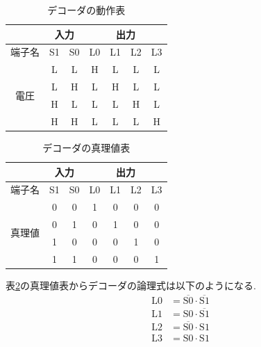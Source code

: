 \documentclass[a4paper, 11pt, uplatex]{jsarticle}
\begin{document}
\begin{table}[H]
  \begin{center}
  \caption{デコーダの動作表}
  \label{デコーダ動作表}
\begin{tabular}{|c|c|c|c|c|c|c|}
\hline
                    & \multicolumn{2}{c|}{入力} & \multicolumn{4}{c|}{出力} \\ \hline
端子名                &S1 & S0 &L0 &L1 &L2 &L3  \\ \hline \hline
\multirow{4}{*}{電圧} & L & L &H &L &L &L \\
                     & L & H &L &H &L &L \\
                     & H & L &L &L &H &L \\
                     & H & H &L &L &L &H \\ \hline
\end{tabular}
\end{center}
\end{table}

\begin{table}[H]
  \begin{center}
  \caption{デコーダの真理値表}
  \label{デコーダ真理値表}
\begin{tabular}{|c|c|c|c|c|c|c|}
\hline
                    & \multicolumn{2}{c|}{入力} & \multicolumn{4}{c|}{出力} \\ \hline
端子名                &S1 & S0 &L0 &L1 &L2 &L3  \\ \hline \hline
\multirow{4}{*}{真理値} & 0 & 0 &1 &0 &0 &0 \\
                     & 0 & 1 &0 &1 &0 &0 \\
                     & 1 & 0 &0 &0 &1 &0 \\
                     & 1 & 1 &0 &0 &0 &1 \\ \hline
\end{tabular}
\end{center}
\end{table}

表\ref{デコーダ真理値表}の真理値表からデコーダの論理式は以下のようになる.
\begin{align}
  \mathrm{L0} &= \overline{\mathrm{S0}} \cdot \overline{\mathrm{S1}} \\
  \mathrm{L1} &= \mathrm{S0} \cdot \overline{\mathrm{S1}} \\
  \mathrm{L2} &= \overline{\mathrm{S0}} \cdot \mathrm{S1} \\
  \mathrm{L3} &= \mathrm{S0} \cdot \mathrm{S1}
\end{align}
\end{document}
